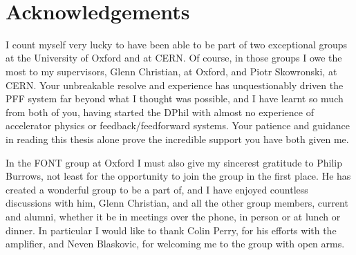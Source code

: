 \pagestyle{empty}

\title{\LARGE{\thesistitle} \\[3cm]}

\author{\Large{\authorname} \\ \Large{\collegename} \\[3cm]}

\date{\DPhiltext \\[1cm] \DPhildate}

\maketitle

\cleardoublepage

\cleardoublepage

\begin{abstract}
\abstext
\end{abstract}

%
%

\cleardoublepage

\section*{Acknowledgements}

I count myself very lucky to have been able to be part of two exceptional groups at the University of Oxford and at CERN. Of course, in those groups I owe the most to my supervisors, Glenn Christian, at Oxford, and Piotr Skowronski, at CERN. 
Your unbreakable resolve and experience has unquestionably driven the PFF system far beyond what I thought was possible, and I have learnt so much from both of you, having started the DPhil with almost no experience of accelerator physics or feedback/feedforward systems.
Your patience and guidance in reading this thesis alone prove the incredible support you have both given me.

In the FONT group at Oxford I must also give my sincerest gratitude to Philip Burrows, not least for the opportunity to join the group in the first place. He has created a wonderful group to be a part of, and I have enjoyed countless discussions with him, Glenn Christian, and all the other group members, current and alumni, whether it be in meetings over the phone, in person or at lunch or dinner. In particular I would like to thank Colin Perry, for his efforts with the amplifier, and Neven Blaskovic, for welcoming me to the group with open arms.

